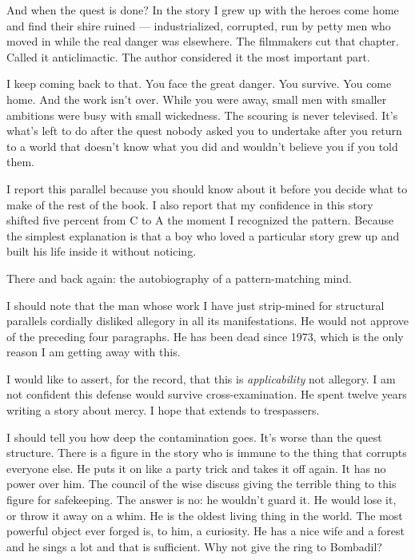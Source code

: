 And when the quest is done? In the story I grew up with the heroes come home and find their shire ruined --- industrialized, corrupted, run by petty men who moved in while the real danger was elsewhere. The filmmakers cut that chapter. Called it anticlimactic. The author considered it the most important part.

I keep coming back to that. You face the great danger. You survive. You come home. And the work isn't over. While you were away, small men with smaller ambitions were busy with small wickedness. The scouring is never televised. It's what's left to do after the quest nobody asked you to undertake after you return to a world that doesn't know what you did and wouldn't believe you if you told them.

I report this parallel because you should know about it before you decide what to make of the rest of the book. I also report that my confidence in this story shifted five percent from C to A the moment I recognized the pattern. Because the simplest explanation is that a boy who loved a particular story grew up and built his life inside it without noticing.

There and back again: the autobiography of a pattern-matching mind.

\vspace{0.5cm}

I should note that the man whose work I have just strip-mined for structural parallels cordially disliked allegory in all its manifestations. He would not approve of the preceding four paragraphs. He has been dead since 1973, which is the only reason I am getting away with this.

I would like to assert, for the record, that this is \textit{applicability} not allegory. I am not confident this defense would survive cross-examination. He spent twelve years writing a story about mercy. I hope that extends to trespassers.

\vspace{0.5cm}

I should tell you how deep the contamination goes. It's worse than the quest structure. There is a figure in the story who is immune to the thing that corrupts everyone else. He puts it on like a party trick and takes it off again. It has no power over him. The council of the wise discuss giving the terrible thing to this figure for safekeeping. The answer is no: he wouldn't guard it. He would lose it, or throw it away on a whim. He is the oldest living thing in the world. The most powerful object ever forged is, to him, a curiosity. He has a nice wife and a forest and he sings a lot and that is sufficient. Why not give the ring to Bombadil?

